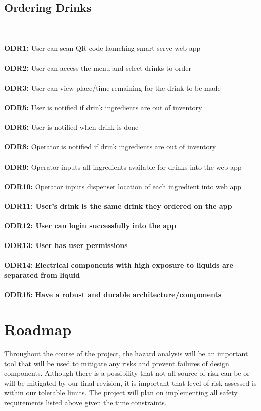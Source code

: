 \documentclass{article}
\begin{document}
    \subsection{Ordering Drinks} 
    \\\\
    \noindent\textbf{ODR1:} User can scan QR code launching smart-serve web app \\\\ 
    \textbf{ODR2:} User can access the menu and select drinks to order\\\\ 
    \textbf{ODR3:} User can view place/time remaining for the drink to be made \\\\ 
    \textbf{ODR5:} User is notified if drink ingredients are out of inventory\\\\ 
    \textbf{ODR6:} User is notified when drink is done\\\\
    \textbf{ODR8:} Operator is notified if drink ingredients are out of inventory\\\\
    \textbf{ODR9:} Operator inputs all ingredients available for drinks into the web app\\\\
    \textbf{ODR10:} Operator inputs dispenser location of each ingredient into web app\\\\
    \textbf{\textbf{ODR11:} User's drink is the same drink they ordered on the app \\\\
    \textbf{ODR12:} User can login successfully into the app 
    \\\\
    \textbf{ODR13:} User has user permissions } \\\\
    \textbf{ODR14:} \textbf{Electrical components with high exposure to liquids are separated from liquid}\\\\
    \textbf{ODR15:} \textbf{Have a robust and durable architecture/components}
    
    
\section{Roadmap}
    Throughout the course of the project, the hazard analysis will be an important tool that will be used to mitigate any risks and prevent failures of design components. Although there is a possibility that not all source of risk can be or will be mitigated by our final revision, it is important that level of risk assessed is within our tolerable limits. The project will plan on implementing all safety requirements listed above given the time constraints. 
    
\end{document}
